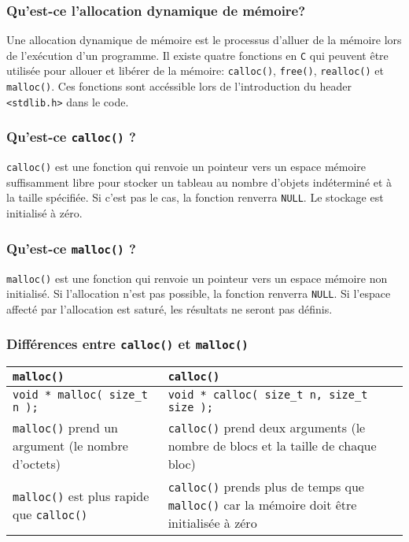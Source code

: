 \documentclass[10pt]{article}
\begin{document}
\begin{itemize}
\end{itemize}

\subsubsection{Qu'est-ce l'allocation dynamique de mémoire?}
Une allocation dynamique de mémoire est le processus d'alluer de la mémoire lors de l'exécution d'un programme. Il existe quatre fonctions en \texttt{C} qui peuvent être utilisée pour allouer et libérer de la mémoire: \texttt{calloc()}, \texttt{free()}, \texttt{realloc()} et \texttt{malloc()}. Ces fonctions sont accéssible lors de l'introduction du header \texttt{<stdlib.h>} dans le code.

\subsubsection{Qu'est-ce \texttt{calloc()} ?}
\texttt{calloc()} est une fonction qui renvoie un pointeur vers un espace mémoire suffisamment libre pour stocker un tableau au nombre d'objets indéterminé et à la taille spécifiée. Si c'est pas le cas, la fonction renverra \texttt{NULL}. Le stockage est initialisé à zéro.

\subsubsection{Qu'est-ce \texttt{malloc()} ?}
\texttt{malloc()} est une fonction qui renvoie un pointeur vers un espace mémoire non initialisé. Si l'allocation n'est pas possible, la fonction renverra \texttt{NULL}. Si l'espace affecté par l'allocation est saturé, les résultats ne seront pas définis.

\subsubsection{Différences entre \texttt{calloc()} et \texttt{malloc()}}
\begin{center}
  \begin{tabularx}{\textwidth}{| >{\centering\arraybackslash}X | >{\centering\arraybackslash}X |}
    \hline
    \textbf{\texttt{malloc()}} & \textbf{\texttt{calloc()}} \\ 
    \hline
    \texttt{void * malloc( size\_t n );} & \texttt{void * calloc( size\_t n, size\_t size );} \\
    \hline
    \texttt{malloc()} prend un argument (le nombre d'octets)  & \texttt{calloc()} prend deux arguments (le nombre de blocs et la taille de chaque bloc)  \\
    \hline
    \texttt{malloc()} est plus rapide que \texttt{calloc()} & \texttt{calloc()} prends plus de temps que \texttt{malloc()} car la mémoire doit être initialisée à zéro \\
    \hline
  \end{tabularx}
\end{center}
\end{document}

